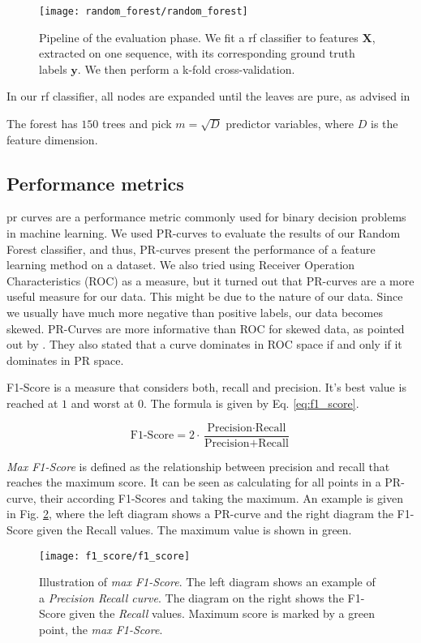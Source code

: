 \begin{figure}[htbp]
  \centering
  \texttt{[image: random\_forest/random\_forest]}
  \caption[Evaluation pipeline]{Pipeline of the evaluation phase. We fit a \gls{rf} classifier to features $\boldsymbol{X}$, extracted on one sequence, with its corresponding ground truth labels $\boldsymbol{y}$.
    We then perform a k-fold cross-validation.}
  \label{fig:random_forest}
\end{figure}

In our \gls{rf} classifier, all nodes are expanded until the leaves are pure, as advised in \cite[pg. 596]{hastie09}

The forest has $150$ trees and pick $m=\sqrt{D}$ predictor variables, where $D$ is the feature dimension.

\subsection{Performance metrics}
\gls{pr} curves are a performance metric commonly used for binary decision problems in machine learning.
We used PR-curves to evaluate the results of our Random Forest classifier, and thus, PR-curves present the performance of a feature learning method on a dataset.
We also tried using Receiver Operation Characteristics (ROC) as a measure, but it turned out that PR-curves are a more useful measure for our data.
This might be due to the nature of our data.
Since we usually have much more negative than positive labels, our data becomes skewed.
PR-Curves are more informative than ROC for skewed data, as pointed out by \cite{davis06}. They also stated that a curve dominates in ROC space if and only if it dominates in PR space.

F1-Score is a measure that considers both, recall and precision. It's best value is reached at $1$ and worst at $0$. The formula is given by Eq. \ref{eq:f1_score}.

\begin{equation}
\textrm{F1-Score} = 2 \cdot \frac{\textrm{Precision} \cdot \textrm{Recall}}{\textrm{Precision} + \textrm{Recall}}
\label{eq:f1_score}
\end{equation}
\hspace{6pt}

\textit{Max F1-Score} is defined as the relationship between precision and recall that reaches the maximum score. It can be seen as calculating for all points in a PR-curve, their according F1-Scores and taking the maximum. An example is given in Fig. \ref{fig:f1_score}, where the left diagram shows a PR-curve and the right diagram the F1-Score given the Recall values. The maximum value is shown in green.

\begin{figure}[ht]
  \centering
  \texttt{[image: f1\_score/f1\_score]}
  \caption[Illustration of max F1-Score]{Illustration of \textit{max F1-Score}. The left diagram shows an example of a \textit{Precision Recall curve}. The diagram on the right shows the F1-Score given the \textit{Recall} values. Maximum score is marked by a green point, the \textit{max F1-Score}.}
  \label{fig:f1_score}
\end{figure}


